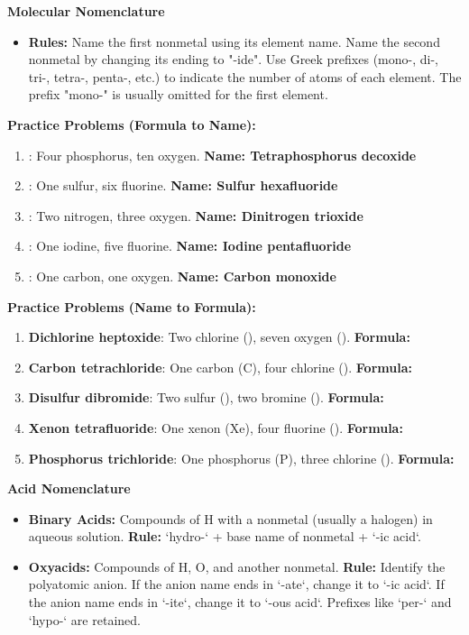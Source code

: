 \documentclass{article}
\begin{document}
\bigskip
\textbf{Molecular Nomenclature}
\begin{itemize}[itemsep=5pt]
    \item \textbf{Rules:} Name the first nonmetal using its element name. Name the second nonmetal by changing its ending to "-ide". Use Greek prefixes (mono-, di-, tri-, tetra-, penta-, etc.) to indicate the number of atoms of each element. The prefix "mono-" is usually omitted for the first element.
\end{itemize}

\textbf{Practice Problems (Formula to Name):}
\begin{enumerate}[itemsep=5pt]
    \item {}: Four phosphorus, ten oxygen. \textbf{Name: Tetraphosphorus decoxide}
    \item {}: One sulfur, six fluorine. \textbf{Name: Sulfur hexafluoride}
    \item {}: Two nitrogen, three oxygen. \textbf{Name: Dinitrogen trioxide}
    \item {}: One iodine, five fluorine. \textbf{Name: Iodine pentafluoride}
    \item {}: One carbon, one oxygen. \textbf{Name: Carbon monoxide}
\end{enumerate}

\textbf{Practice Problems (Name to Formula):}
\begin{enumerate}[itemsep=5pt]
    \item \textbf{Dichlorine heptoxide}: Two chlorine (), seven oxygen (). \textbf{Formula: }
    \item \textbf{Carbon tetrachloride}: One carbon (C), four chlorine (). \textbf{Formula: }
    \item \textbf{Disulfur dibromide}: Two sulfur (), two bromine (). \textbf{Formula: }
    \item \textbf{Xenon tetrafluoride}: One xenon (Xe), four fluorine (). \textbf{Formula: }
    \item \textbf{Phosphorus trichloride}: One phosphorus (P), three chlorine (). \textbf{Formula: }
\end{enumerate}

\bigskip
\textbf{Acid Nomenclature}
\begin{itemize}[itemsep=5pt]
    \item \textbf{Binary Acids:} Compounds of H with a nonmetal (usually a halogen) in aqueous solution. \textbf{Rule:} `hydro-` + base name of nonmetal + `-ic acid`.
    \item \textbf{Oxyacids:} Compounds of H, O, and another nonmetal. \textbf{Rule:} Identify the polyatomic anion. If the anion name ends in `-ate`, change it to `-ic acid`. If the anion name ends in `-ite`, change it to `-ous acid`. Prefixes like `per-` and `hypo-` are retained.
\end{itemize}
\end{document}
